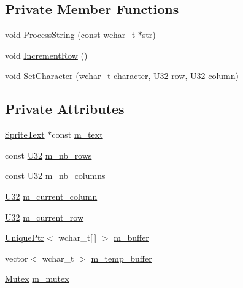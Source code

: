 \subsection*{Private Member Functions}
\begin{DoxyCompactItemize}
\item 
void \hyperlink{classmage_1_1script_1_1_text_console_script_a29334fd8aa8de09b2f28c24096347498}{Process\+String} (const wchar\+\_\+t $\ast$str)
\item 
void \hyperlink{classmage_1_1script_1_1_text_console_script_a3d4cba4fd8a2733933a7a444c6beaf1a}{Increment\+Row} ()
\item 
void \hyperlink{classmage_1_1script_1_1_text_console_script_a18bdee79ee6f53e28f90b607c36c8188}{Set\+Character} (wchar\+\_\+t character, \hyperlink{namespacemage_a41c104c036fba3756a74e19f793eeaa1}{U32} row, \hyperlink{namespacemage_a41c104c036fba3756a74e19f793eeaa1}{U32} column)
\end{DoxyCompactItemize}
\subsection*{Private Attributes}
\begin{DoxyCompactItemize}
\item 
\hyperlink{classmage_1_1_sprite_text}{Sprite\+Text} $\ast$const \hyperlink{classmage_1_1script_1_1_text_console_script_a60b0a4e3de62e240df32fa2576c67b73}{m\+\_\+text}
\item 
const \hyperlink{namespacemage_a41c104c036fba3756a74e19f793eeaa1}{U32} \hyperlink{classmage_1_1script_1_1_text_console_script_a9d00451cf1cf319512e0c88352d22911}{m\+\_\+nb\+\_\+rows}
\item 
const \hyperlink{namespacemage_a41c104c036fba3756a74e19f793eeaa1}{U32} \hyperlink{classmage_1_1script_1_1_text_console_script_a480c394aece0f517b9d10c4e912aadc9}{m\+\_\+nb\+\_\+columns}
\item 
\hyperlink{namespacemage_a41c104c036fba3756a74e19f793eeaa1}{U32} \hyperlink{classmage_1_1script_1_1_text_console_script_a10d396ae897b441a7cfc1f77c50eb16e}{m\+\_\+current\+\_\+column}
\item 
\hyperlink{namespacemage_a41c104c036fba3756a74e19f793eeaa1}{U32} \hyperlink{classmage_1_1script_1_1_text_console_script_abd3f8ee3c17545968fcf403ec9aef83d}{m\+\_\+current\+\_\+row}
\item 
\hyperlink{namespacemage_a3316d7143a973e37adf1110f2e80ca31}{Unique\+Ptr}$<$ wchar\+\_\+t\mbox{[}$\,$\mbox{]} $>$ \hyperlink{classmage_1_1script_1_1_text_console_script_a35db160ce89d4ebf6f184d2fe850beab}{m\+\_\+buffer}
\item 
vector$<$ wchar\+\_\+t $>$ \hyperlink{classmage_1_1script_1_1_text_console_script_a3e38273632b6d528ca7707a46bc33063}{m\+\_\+temp\+\_\+buffer}
\item 
\hyperlink{structmage_1_1_mutex}{Mutex} \hyperlink{classmage_1_1script_1_1_text_console_script_af9962aa57cbbe3b8bbc2217d2f28112b}{m\+\_\+mutex}
\end{DoxyCompactItemize}
